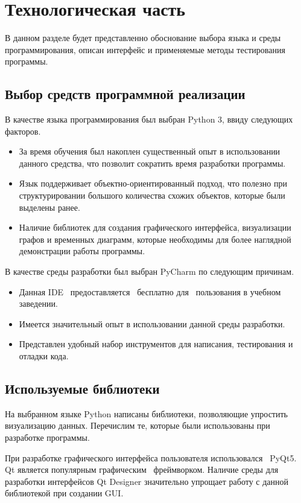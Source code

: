 \section{Технологическая часть}

В данном разделе будет представленно обоснование выбора языка и среды программирования, описан интерфейс и применяемые методы тестирования программы.

\subsection{Выбор средств программной реализации}
В качестве языка программирования был выбран Python 3, ввиду следующих факторов.

\begin{itemize}
	\item За время обучения был накоплен существенный опыт в использовании данного средства, что позволит сократить время разработки программы.
	\item Язык поддерживает объектно-ориентированный подход, что полезно при структурировании большого количества схожих объектов, которые были выделены ранее.
	\item Наличие библиотек для создания графического интерфейса, визуализации графов и временных диаграмм, которые необходимы для более наглядной демонстрации работы программы.
\end{itemize}
\qquad
В качестве среды разработки был выбран PyCharm по следующим причинам.
\begin{itemize}
	\item Данная IDE  \, предоставляется \, бесплатно для \, пользования в учебном \, заведении\cite{tech:pycharm}.
	\item Имеется значительный опыт в использовании данной среды разработки.
	\item Представлен удобный набор инструментов для написания, тестирования и отладки кода.
\end{itemize}

\subsection{Используемые библиотеки}
На выбранном языке Python написаны библиотеки, позволяющие упростить визуализацию данных. Перечислим те, которые были использованы при разработке программы.

При разработке графического интерфейса пользователя использовался \, PyQt5. Qt является популярным графическим \, фреймворком\cite{libs:pyqt}. Наличие среды для разработки интерфейсов Qt Designer значительно упрощает работу с данной библиотекой при создании GUI.

